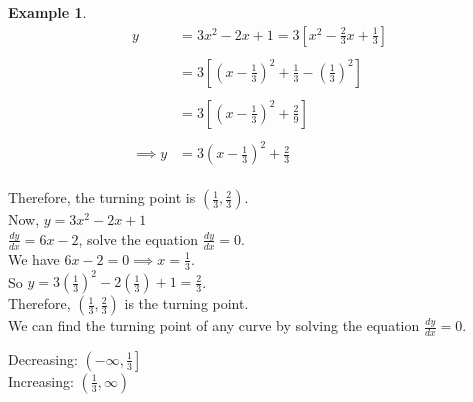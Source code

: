 \documentclass[11pt,a4paper]{article}
\theoremstyle{definition}
\newtheorem{example}[thm]{Example}
\begin{document}
\begin{example}

\begin{align*}
y & = 3x^2-2x+1
   = 3\left[x^2-\frac{2}{3}x+\frac{1}{3}\right]\\\\
  & = 3\left[\left(x-\frac{1}{3}\right)^2+\frac{1}{3}-\left(\frac{1}{3}\right)^2\right]\\\\
  & = 3\left[\left(x-\frac{1}{3}\right)^2+\frac{2}{9}\right]\\\\
\implies y  & = 3\left(x-\frac{1}{3}\right)^2+\frac{2}{3}\\
\end{align*}


Therefore, the turning point is $\left(\frac{1}{3},\frac{2}{3}\right)$.\\

Now, $y=3x^2-2x+1$\\

$\frac{dy}{dx}=6x-2$, solve the equation $\frac{dy}{dx}=0$.\\

We have $6x-2=0\implies x=\frac{1}{3}$.\\

So $y=3\left(\frac{1}{3}\right)^2-2\left(\frac{1}{3}\right)+1=\frac{2}{3}$.\\

Therefore, $\left(\frac{1}{3},\frac{2}{3}\right)$ is the turning point.\\ We can find the turning point of any curve by solving the equation $\frac{dy}{dx}=0$.\\



\begin{figure}[H]
\centering
{}
\end{figure}



Decreasing: $\left(-\infty,\frac{1}{3}\right]$\\

Increasing: $\left(\frac{1}{3},\infty\right)$
\end{example}
\end{document}
